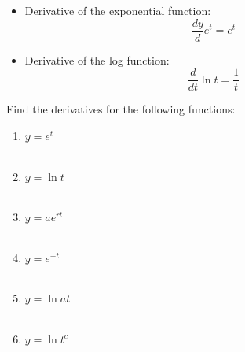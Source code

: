 \documentclass{./../../Latex/handout}
\begin{document}
\thispagestyle{plain}

\begin{itemize}
  \item Derivative of the exponential function:
  $$ \frac{dy}{d}e^t = e^t$$
  \item Derivative of the log function:
 $$\frac{d}{d t} \ln t =\frac{1}{t}$$
\end{itemize}

Find the derivatives for the following functions:\\
\begin{enumerate}
\item $y=e^t$ \\~\\
\item $y=\ln t$ \\~\\
\item $y=ae^{rt}$ \\~\\
\item $y=e^{-t}$ \\~\\
\item $y=\ln a t$ \\~\\
\item $y=\ln t^{c}$ \\~\\
\end{enumerate}
\end{document}
